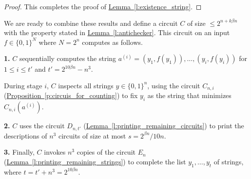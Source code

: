 \documentclass[11pt]{article}
\numberwithin{equation}{section}
\theoremstyle{definition}
\theoremstyle{plain}
\newcommand{\expref}[2]{\hyperref[#2]{#1~\ref{#2}}}
\begin{document}
\begin{proof}
This completes the proof of \expref{Lemma}{l:existence_string}.
\end{proof}




We are ready to combine these results and define a circuit $C$ of size $\leq 2^{n + k \beta n}$ with the property stated in \expref{Lemma}{l:antichecker}. This circuit on an input $f \in \{0,1\}^N$ where $N = 2^n$ computes as follows.

\vspace{0.4cm}

\noindent \textbf{1.} $C$ sequentially computes the string $a^{(i)} = (y_1, f(y_1)), \ldots, (y_i,f(y_i))$ for $1 \leq i \leq t'$ and $t' = 2^{10 \beta n} - n^3$.

\vspace{0.2cm}

During stage $i$, $C$ inspects all strings $y \in \{0,1\}^n$, using the circuit $C_{n,i}$ (\expref{Proposition}{p:circuis_for_counting}) to fix $y_i$ as the string that minimizes $C_{n,i}(a^{(i)})$.

\vspace{0.3cm}

\noindent \textbf{2.} $C$ uses the circuit $D_{n,t'}$ (\expref{Lemma}{l:printing_remaining_circuits}) to print the descriptions of $n^3$ circuits of size at most $s =  2^{\beta n}/10n$.

\vspace{0.3cm}

\noindent \textbf{3.} Finally, $C$ invokes $n^3$ copies of the circuit $E_n$ (\expref{Lemma}{l:printing_remaining_strings}) to complete the list $y_1, \ldots, y_t$ of strings, where $t = t' + n^3 = 2^{10 \beta n}$.\\
\end{document}

